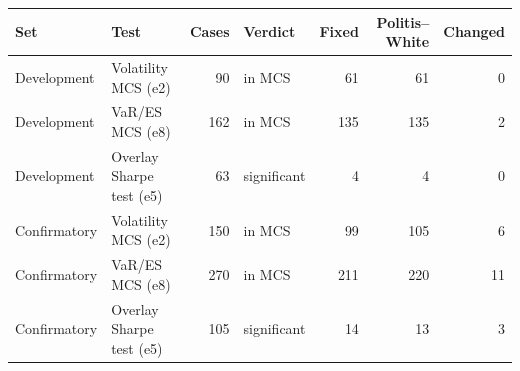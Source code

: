 \begin{tabular}{llrlrrr}
\toprule
Set & Test & Cases & Verdict & Fixed & Politis--White & Changed \\
\midrule
Development & Volatility MCS (e2) & 90 & in MCS & 61 & 61 & 0\\
Development & VaR/ES MCS (e8) & 162 & in MCS & 135 & 135 & 2\\
Development & Overlay Sharpe test (e5) & 63 & significant & 4 & 4 & 0\\
Confirmatory & Volatility MCS (e2) & 150 & in MCS & 99 & 105 & 6\\
Confirmatory & VaR/ES MCS (e8) & 270 & in MCS & 211 & 220 & 11\\
Confirmatory & Overlay Sharpe test (e5) & 105 & significant & 14 & 13 & 3\\
\bottomrule
\end{tabular}
